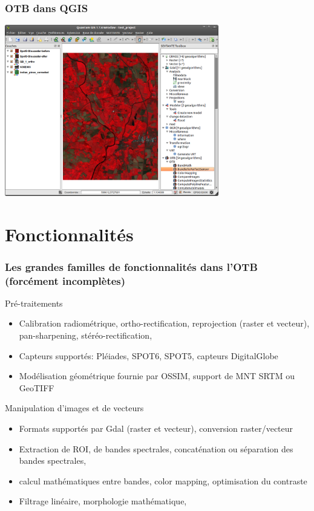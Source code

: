 \documentclass[8pt]{beamer}
\begin{document}
\begin{frame}
\frametitle{OTB dans QGIS}
\begin{minipage}[t][6cm][t]{\textwidth}
\begin{center}
\includegraphics[width=0.7\textwidth]{images/otb_qgis.png}
\end{center}
\end{minipage}
\end{frame}

\section{Fonctionnalités}

\begin{frame}
\frametitle{Les grandes familles de fonctionnalités dans l'OTB (forcément incomplètes)}

\begin{block}{Pré-traitements}
\begin{itemize}
\item Calibration radiométrique, ortho-rectification, reprojection (raster et vecteur), pan-sharpening, stéréo-rectification,
\item Capteurs supportés: Pléiades, SPOT6, SPOT5, capteurs DigitalGlobe
\item Modélisation géométrique fournie par OSSIM, support de MNT SRTM ou GeoTIFF
\end{itemize}
\end{block}

\begin{block}{Manipulation d'images et de vecteurs}
\begin{itemize}
\item Formats supportés par Gdal (raster et vecteur), conversion raster/vecteur
\item Extraction de ROI, de bandes spectrales, concaténation ou séparation des bandes spectrales,
\item calcul mathématiques entre bandes, color mapping, optimisation du contraste
\item Filtrage linéaire, morphologie mathématique,
\end{itemize}
\end{block}
\end{frame}
\end{document}
